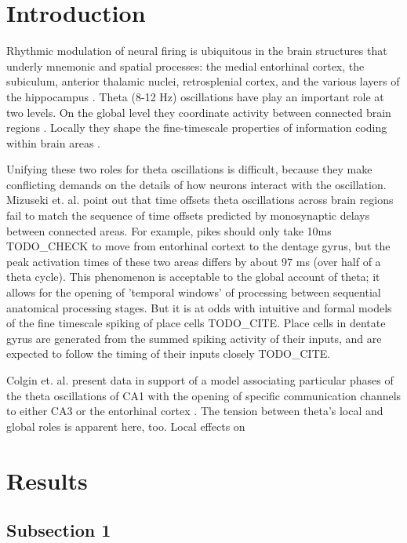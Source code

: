 \documentclass[10pt]{article}
\begin{document}
\section*{Introduction}
Rhythmic modulation of neural firing is ubiquitous in the brain structures that underly mnemonic and spatial processes: the medial entorhinal cortex, the subiculum, anterior thalamic nuclei, retrosplenial cortex, and the various layers of the hippocampus \cite{vanderwolf1969hippocampal, buzsaki2002theta}.  Theta (8-12 Hz) oscillations have play an important role at two levels. On the global level they coordinate activity between connected brain regions \cite{Siapas2006, Jones2006, Serota2010, Colgin2011}. Locally they shape the fine-timescale properties of information coding within brain areas \cite{Recce1993,Skaggs1996,Mehta2002,Leutgeb2010}.


Unifying these two roles for theta oscillations is difficult, because they make conflicting demands on the details of how neurons interact with the oscillation.  Mizuseki et. al. \cite{Mizuseki2009} point out that time offsets theta oscillations across brain regions fail to match the sequence  of time offsets predicted by monosynaptic delays between connected areas.  For example, pikes should only take 10ms TODO_CHECK to move from entorhinal cortext to the dentage gyrus, but the peak activation times of these two areas differs by about 97 ms (over half of a theta cycle).  This phenomenon is acceptable to the global account of theta; it allows for the opening of 'temporal windows' of processing between sequential anatomical processing stages.  But it is at odds with intuitive and formal models of the fine timescale spiking of place cells TODO_CITE.  Place cells in dentate gyrus are generated from the summed spiking activity of their inputs, and are expected to follow the timing of their inputs closely TODO_CITE.

Colgin et. al. present data in support of a model associating particular phases of the theta oscillations of CA1 with the opening of specific communication channels to either CA3 or the entorhinal cortex \cite{Colgin2009}.  The tension between theta's local and global roles is apparent here, too.  Local effects on 

\section*{Results}

\subsection*{Subsection 1}
\end{document}
